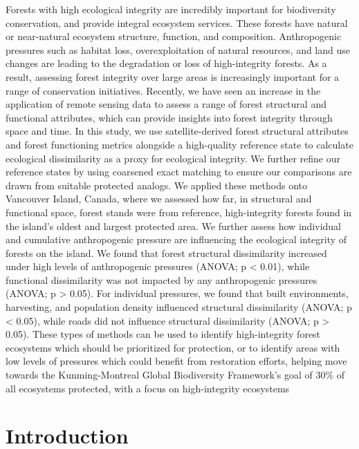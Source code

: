 \documentclass[
]{agujournal2019}
\begin{document}
Forests with high ecological integrity are incredibly important for
biodiversity conservation, and provide integral ecosystem services.
These forests have natural or near-natural ecosystem structure,
function, and composition. Anthropogenic pressures such as habitat loss,
overexploitation of natural resources, and land use changes are leading
to the degradation or loss of high-integrity forests. As a result,
assessing forest integrity over large areas is increasingly important
for a range of conservation initiatives. Recently, we have seen an
increase in the application of remote sensing data to assess a range of
forest structural and functional attributes, which can provide insights
into forest integrity through space and time. In this study, we use
satellite-derived forest structural attributes and forest functioning
metrics alongside a high-quality reference state to calculate ecological
dissimilarity as a proxy for ecological integrity. We further refine our
reference states by using coarsened exact matching to ensure our
comparisons are drawn from suitable protected analogs. We applied these
methods onto Vancouver Island, Canada, where we assessed how far, in
structural and functional space, forest stands were from reference,
high-integrity forests found in the island's oldest and largest
protected area. We further assess how individual and cumulative
anthropogenic pressure are influencing the ecological integrity of
forests on the island. We found that forest structural dissimilarity
increased under high levels of anthropogenic pressures (ANOVA; p
\textless{} 0.01), while functional dissimilarity was not impacted by
any anthropogenic pressures (ANOVA; p \textgreater{} 0.05). For
individual pressures, we found that built environments, harvesting, and
population density influenced structural dissimilarity (ANOVA; p
\textless{} 0.05), while roads did not influence structural
dissimilarity (ANOVA; p \textgreater{} 0.05). These types of methods can
be used to identify high-integrity forest ecosystems which should be
prioritized for protection, or to identify areas with low levels of
pressures which could benefit from restoration efforts, helping move
towards the Kunming-Montreal Global Biodiversity Framework's goal of
30\% of all ecosystems protected, with a focus on high-integrity
ecosystems

\section{Introduction}\label{introduction}
\end{document}
